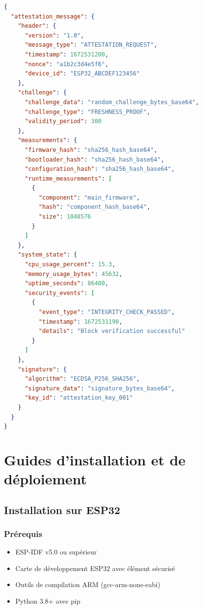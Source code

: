 \begin{lstlisting}[language=JSON, caption={Format de message d'attestation}]
{
  "attestation_message": {
    "header": {
      "version": "1.0",
      "message_type": "ATTESTATION_REQUEST",
      "timestamp": 1672531200,
      "nonce": "a1b2c3d4e5f6",
      "device_id": "ESP32_ABCDEF123456"
    },
    "challenge": {
      "challenge_data": "random_challenge_bytes_base64",
      "challenge_type": "FRESHNESS_PROOF",
      "validity_period": 300
    },
    "measurements": {
      "firmware_hash": "sha256_hash_base64",
      "bootloader_hash": "sha256_hash_base64",
      "configuration_hash": "sha256_hash_base64",
      "runtime_measurements": [
        {
          "component": "main_firmware",
          "hash": "component_hash_base64",
          "size": 1048576
        }
      ]
    },
    "system_state": {
      "cpu_usage_percent": 15.3,
      "memory_usage_bytes": 45632,
      "uptime_seconds": 86400,
      "security_events": [
        {
          "event_type": "INTEGRITY_CHECK_PASSED",
          "timestamp": 1672531190,
          "details": "Block verification successful"
        }
      ]
    },
    "signature": {
      "algorithm": "ECDSA_P256_SHA256",
      "signature_data": "signature_bytes_base64",
      "key_id": "attestation_key_001"
    }
  }
}
\end{lstlisting}

\chapter{Guides d'installation et de déploiement}
\label{app:installation-guides}

\section{Installation sur ESP32}

\subsection{Prérequis}

\begin{itemize}
    \item ESP-IDF v5.0 ou supérieur
    \item Carte de développement ESP32 avec élément sécurisé
    \item Outils de compilation ARM (gcc-arm-none-eabi)
    \item Python 3.8+ avec pip
\end{itemize}

